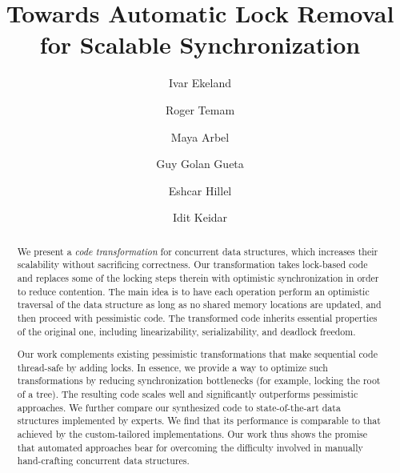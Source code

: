 \documentclass[oribibl]{llncs}
\begin{document}
\title{Towards Automatic Lock Removal\\ for Scalable Synchronization}

\author{Ivar Ekeland \and Roger Temam}
\author{
Maya Arbel\fnmsep{}
\and Guy Golan Gueta  
\and Eshcar Hillel  
\and Idit Keidar\fnmsep{}} 



\maketitle

\begin{abstract}
We present a \emph{code transformation} for concurrent data structures,
which increases their scalability without sacrificing correctness.
Our transformation takes lock-based code and replaces some of the
locking steps therein with optimistic synchronization in order to reduce contention. The main idea is to
have each operation perform an optimistic traversal of the data structure
as long as no shared memory locations are updated, and then proceed with
pessimistic code. The transformed code inherits essential
properties of the original one, including linearizability, serializability,
and deadlock freedom.

Our work complements existing pessimistic transformations that make
sequential code thread-safe by adding locks.
In essence, we provide a way to optimize such transformations by reducing
synchronization bottlenecks (for example, locking the root of a tree).
The resulting code scales well and significantly outperforms
pessimistic approaches. We further compare our synthesized code to state-of-the-art
data structures implemented by experts.
We find that its performance is comparable %
to that achieved by the custom-tailored implementations.
Our work thus shows the promise that automated approaches
bear for overcoming the difficulty involved in manually
hand-crafting concurrent data structures.

\end{abstract}



\thispagestyle{empty}





%

%








%

%
%
\end{document}
